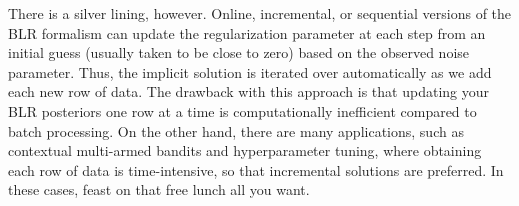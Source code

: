 \documentclass{article}
\begin{document}
There is a silver lining, however. Online, incremental, or sequential versions of the BLR formalism can update the regularization parameter at each step from an initial guess (usually taken to be close to zero) based on the observed noise parameter. Thus, the implicit solution is iterated over automatically as we add each new row of data. The drawback with this approach is that updating your BLR posteriors one row at a time is computationally inefficient compared to batch processing. On the other hand, there are many applications, such as contextual multi-armed bandits and hyperparameter tuning, where obtaining each row of data is time-intensive, so that incremental solutions are preferred. In these cases, feast on that free lunch all you want.


\printbibliography
\end{document}
